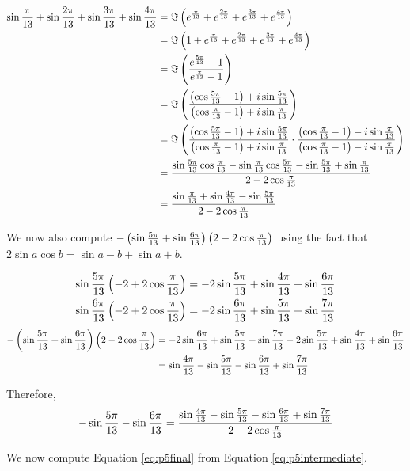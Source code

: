 \documentclass[10pt]{../usamts}
\begin{document}
\begin{solution}
\begin{align*}
    \sin{{\frac{\pi}{13}}} + \sin{{\frac{2\pi}{13}}} + \sin{{\frac{3\pi}{13}}} + \sin{{\frac{4\pi}{13}}}
    &=\Im\left( e^{\frac{\pi}{13}} + e^{\frac{2\pi}{13}} + e^{\frac{3\pi}{13}} + e^{\frac{4\pi}{13}} \right) \\
    &= \Im\left( 1 + e^{\frac{\pi}{13}} + e^{\frac{2\pi}{13}} + e^{\frac{3\pi}{13}} + e^{\frac{4\pi}{13}} \right)\\
    &= \Im\left( \frac{e^{\frac{5\pi}{13}} - 1}{e^{\frac{\pi}{13}} - 1} \right) \\
    &= \Im\left( \frac{\left( \cos{{\frac{5\pi}{13}}}-1 \right) + i\sin{{\frac{5\pi}{13}}}}{\left( \cos{{\frac{\pi}{13}}}-1 \right) + i\sin{{\frac{\pi}{13}}}} \right) \\
    &= \Im\left( \frac{\left( \cos{{\frac{5\pi}{13}}}-1 \right) + i\sin{{\frac{5\pi}{13}}}}{\left( \cos{{\frac{\pi}{13}}}-1 \right) + i\sin{{\frac{\pi}{13}}}}
    \cdot \frac{\left( \cos{{\frac{\pi}{13}}}-1 \right) - i\sin{{\frac{\pi}{13}}}}{\left( \cos{{\frac{\pi}{13}}}-1 \right) - i\sin{{\frac{\pi}{13}}}} \right)\\
    &= \frac{\sin{{\frac{5\pi}{13}}}\cos{{\frac{\pi}{13}}}  - \sin{{\frac{\pi}{13}}}\cos{{\frac{5\pi}{13}}} - \sin{{\frac{5\pi}{13}}} + \sin{{\frac{\pi}{13}}}}
    {2 - 2\cos{{\frac{\pi}{13}}}} \\
    &= \frac{\sin{{\frac{\pi}{13}}} + \sin{{\frac{4\pi}{13}}} - \sin{{\frac{5\pi}{13}}}} {2 - 2\cos{{\frac{\pi}{13}}}}
\end{align*}

We now also compute $-\left( \sin{{\frac{5\pi}{13}}} + \sin{{\frac{6\pi}{13}}} \right)\left( 2 - 2\cos{{\frac{\pi}{13}}} \right)$ using the fact that $2\sin{a}\cos{b} = \sin{a-b} + \sin{a+b}$.

\begin{align*}
    \sin{{\frac{5\pi}{13}}}\left( -2 + 2\cos{{\frac{\pi}{13}}} \right) &= -2\sin{{\frac{5\pi}{13}}} + \sin{{\frac{4\pi}{13}}} + \sin{{\frac{6\pi}{13}}} \\
    \sin{{\frac{6\pi}{13}}}\left( -2 + 2\cos{{\frac{\pi}{13}}} \right) &= -2\sin{{\frac{6\pi}{13}}} + \sin{{\frac{5\pi}{13}}} + \sin{{\frac{7\pi}{13}}}
\end{align*}
\begin{align*}
    -\left( \sin{{\frac{5\pi}{13}}} + \sin{{\frac{6\pi}{13}}} \right)\left( 2 - 2\cos{{\frac{\pi}{13}}} \right)
    &= -2\sin{{\frac{6\pi}{13}}} + \sin{{\frac{5\pi}{13}}} + \sin{{\frac{7\pi}{13}}} -2\sin{{\frac{5\pi}{13}}} + \sin{{\frac{4\pi}{13}}} + \sin{{\frac{6\pi}{13}}} \\
    &= \sin{{\frac{4\pi}{13}}} - \sin{{\frac{5\pi}{13}}} -\sin{{\frac{6\pi}{13}}} + \sin{{\frac{7\pi}{13}}}
\end{align*}

Therefore,
\[
-\sin{{\frac{5\pi}{13}}} -\sin{{\frac{6\pi}{13}}} = \frac{\sin{{\frac{4\pi}{13}}} - \sin{{\frac{5\pi}{13}}} -\sin{{\frac{6\pi}{13}}} + \sin{{\frac{7\pi}{13}}}}{2 - 2 \cos{{\frac{\pi}{13}}}}
\]

We now compute Equation \ref{eq:p5final} from Equation \ref{eq:p5intermediate}.


\end{solution}
\end{document}
